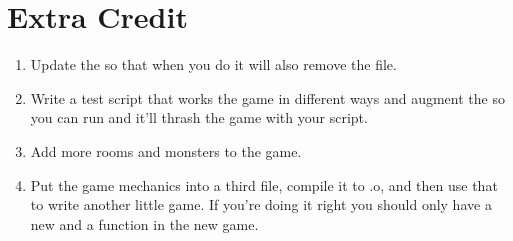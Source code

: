 \section{Extra Credit}

\begin{enumerate}
\item Update the  so that when you do  
     it will also remove the  file.
\item Write a test script that works the game in different ways and augment
    the  so you can run  and it'll thrash
    the game with your script.
\item Add more rooms and monsters to the game.
\item Put the game mechanics into a third file, compile it to .o, and then
    use that to write another little game.  If you're doing it right
    you should only have a new  and a  function
    in the new game.
\end{enumerate}

